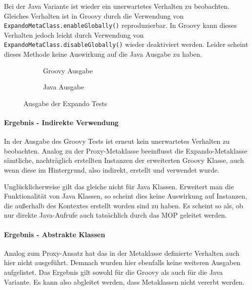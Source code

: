 Bei der Java Variante ist wieder ein unerwartetes Verhalten zu beobachten.
Gleiches Verhalten ist in Groovy durch die Verwendung von \texttt{ExpandoMetaClass.enableGlobally()} reproduzierbar. 
In Groovy kann dieses Verhalten jedoch leicht durch Verwendung von \texttt{ExpandoMetaClass.disableGlobally()} wieder deaktiviert werden.
Leider scheint dieses Methode keine Auswirkung auf die Java Ausgabe zu haben.



\begin{figure}[hbt!]
	\begin{subfigure}{\textwidth}
		
		\caption{Groovy Ausgabe}
	\end{subfigure}
	
	\begin{subfigure}{\textwidth}
		
		\caption{Java Ausgabe}
	\end{subfigure}
	
	\caption{Ausgabe der Expando Tests}
	\label{fig:expando-out}
\end{figure}

\paragraph{Ergebnis - Indirekte Verwendung}
In der Ausgabe des Groovy Tests ist erneut kein unerwartetes Verhalten zu beobachten.
Analog zu der Proxy-Metaklasse beeinflusst die Expando-Metaklasse sämtliche, nachträglich erstellten Instanzen der erweiterten Groovy Klasse, auch wenn diese im Hintergrund, also indirekt, erstellt und verwendet wurde. 

Unglücklicherweise gilt das gleiche nicht für Java Klassen. 
Erweitert man die Funktionalität von Java Klassen, so scheint dies keine Auswirkung auf Instanzen, die außerhalb des Kontextes erstellt worden sind zu haben.
Es scheint so als, ob nur direkte Java-Aufrufe auch tatsächlich durch das MOP geleitet werden.


\paragraph{Ergebnis - Abstrakte Klassen}
Analog zum Proxy-Ansatz hat das in der Metaklasse definierte Verhalten auch hier nicht ausgeführt.
Demnach wurden hier ebenfalls keine weiteren Ausgaben aufgelistet.
Das Ergebnis gilt sowohl für die Groovy als auch für die Java Variante.
Es kann also abgleitet werden, dass Metaklassen nicht vererbt werden.








